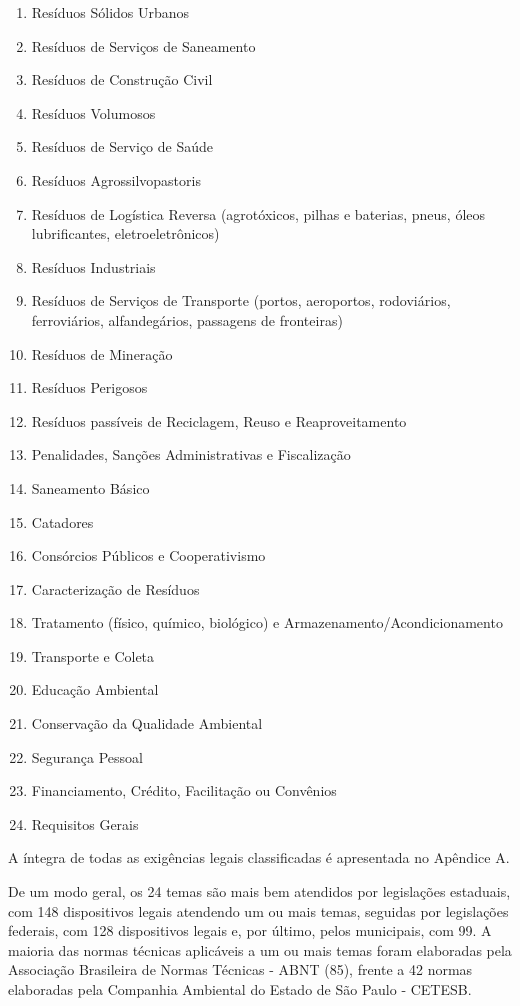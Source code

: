 	\begin{enumerate}
		\item Resíduos Sólidos Urbanos
		\item Resíduos de Serviços de Saneamento
		\item Resíduos de Construção Civil
		\item Resíduos Volumosos
		\item Resíduos de Serviço de Saúde
		\item Resíduos Agrossilvopastoris
		\item Resíduos de Logística Reversa (agrotóxicos, pilhas e baterias, pneus, óleos lubrificantes, eletroeletrônicos)
		\item Resíduos Industriais
		\item Resíduos de Serviços de Transporte (portos, aeroportos, rodoviários, ferroviários, alfandegários, passagens de fronteiras)
		\item Resíduos de Mineração
		\item Resíduos Perigosos
		\item Resíduos passíveis de Reciclagem, Reuso e Reaproveitamento
		\item Penalidades, Sanções Administrativas e Fiscalização
		\item Saneamento Básico
		\item Catadores
		\item Consórcios Públicos e Cooperativismo
		\item Caracterização de Resíduos
		\item Tratamento (físico, químico, biológico) e Armazenamento/Acondicionamento
		\item Transporte e Coleta
		\item Educação Ambiental
		\item Conservação da Qualidade Ambiental
		\item Segurança Pessoal
		\item Financiamento, Crédito, Facilitação ou Convênios
		\item Requisitos Gerais
	\end{enumerate}
	
	A íntegra de todas as exigências legais classificadas é apresentada no Apêndice A.
	
	De um modo geral, os 24 temas são mais bem atendidos por legislações estaduais, com 148 dispositivos legais atendendo um ou mais temas, seguidas por legislações federais, com 128 dispositivos legais e, por último, pelos municipais, com 99. A maioria das normas técnicas aplicáveis a um ou mais temas foram elaboradas pela Associação Brasileira de Normas Técnicas - ABNT (85), frente a 42 normas elaboradas pela Companhia Ambiental do Estado de São Paulo - CETESB. 
	
